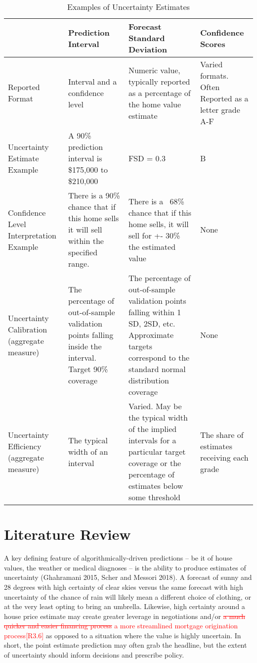 \documentclass[colTwo]{anon}
\theoremstyle{definition}
\begin{document}
\begin{table*}[h!]
\centering
\begin{tabular}{|p{2.4cm} | p{3.99cm} | p{3.99cm} | p{3.99cm} |} 
 \hline
  & \textbf{Prediction Interval} & \textbf{Forecast Standard Deviation} & \textbf{Confidence Scores} \\ [0.5ex] 
 \hline\hline
 Reported Format & Interval and a confidence level & Numeric value, typically reported as a percentage of the home value estimate & Varied formats. Often Reported as a letter grade A-F \\ \hline
 Uncertainty Estimate Example & A 90\% prediction interval is \$175,000 to \$210,000 & FSD = 0.3 & B \\
 \hline
Confidence Level Interpretation Example & There is a 90\% chance that if this home sells it will sell within the specified range. & There is a ~68\% chance that if this home sells, it will sell for +- 30\% the estimated value & None \\
\hline
Uncertainty Calibration
(aggregate measure) & The percentage of out-of-sample validation points falling inside the interval. Target 90\% coverage & The percentage of out-of-sample validation points falling within 1 SD, 2SD, etc. Approximate targets correspond to the standard normal distribution coverage & None \\
\hline
 Uncertainty Efficiency
(aggregate measure)
 & The typical width of an interval & Varied. May be the typical width of the implied intervals for a particular target coverage or the percentage of estimates below some threshold & The share of estimates receiving each grade \\ [1ex] 
 \hline
\end{tabular}
\caption{Examples of Uncertainty Estimates}
\label{table:1}
\end{table*}

\section{Literature Review}

A key defining feature of algorithmically-driven predictions -- be it of house values, the weather or medical diagnoses -- is the ability to produce estimates of uncertainty (Ghahramani 2015, Scher and Messori 2018).  A forecast of sunny and 28 degrees with high certainty of clear skies versus the same forecast with high uncertainty of the chance of rain will likely mean a different choice of clothing, or at the very least opting to bring an umbrella.  Likewise, high certainty around a house price estimate may create greater leverage in negotiations and/or \textcolor{red}{\st{a much quicker and easier financing process} a more streamlined mortgage origination process[R3.6]} as opposed to a situation where the value is highly uncertain.  In short, the point estimate prediction may often grab the headline, but the extent of uncertainty should inform decisions and prescribe policy.   
\end{document}
